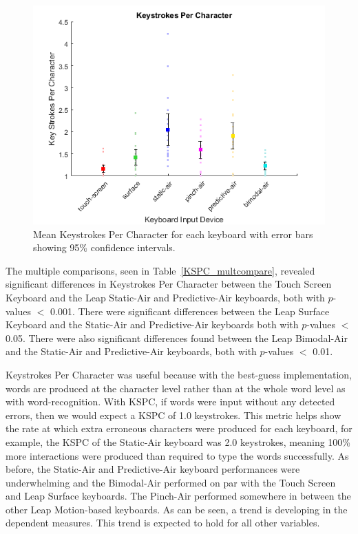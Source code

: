 \begin{figure}[h]
	\centering
	\includegraphics{fig_KSPC_mean}
	\caption[Mean Keystrokes Per Character]{Mean Keystrokes Per Character for each keyboard with error bars showing 95\% confidence intervals.}
	\label{fig_KSPC_mean}
\end{figure}

The multiple comparisons, seen in Table~\ref{KSPC_multcompare}, revealed significant differences in Keystrokes Per Character between the Touch Screen Keyboard and the Leap Static-Air and Predictive-Air keyboards, both with $p$-values $<$ 0.001. There were significant differences between the Leap Surface Keyboard and the Static-Air and Predictive-Air keyboards both with $p$-values $<$ 0.05. There were also significant differences found between the Leap Bimodal-Air and the Static-Air and Predictive-Air keyboards, both with $p$-values $<$ 0.01.

Keystrokes Per Character was useful because with the best-guess implementation, words are produced at the character level rather than at the whole word level as with word-recognition. With KSPC, if words were input without any detected errors, then we would expect a KSPC of 1.0 keystrokes. This metric helps show the rate at which extra erroneous characters were produced for each keyboard, for example, the KSPC of the Static-Air keyboard was 2.0 keystrokes, meaning 100\% more interactions were produced than required to type the words successfully. As before, the Static-Air and Predictive-Air keyboard performances were underwhelming and the Bimodal-Air performed on par with the Touch Screen and Leap Surface keyboards. The Pinch-Air performed somewhere in between the other Leap Motion-based keyboards. As can be seen, a trend is developing in the dependent measures. This trend is expected to hold for all other variables.

